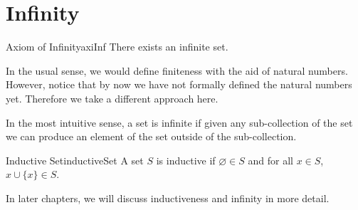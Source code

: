 \documentclass[math]{amznotes}
\theoremstyle{remark}
\begin{document}
\section{Infinity}
\begin{axibox}{Axiom of Infinity}{axiInf}
    There exists an infinite set.
\end{axibox}
In the usual sense, we would define finiteness with the aid of natural numbers. However, notice that by now we have not formally defined the natural numbers yet. Therefore we take a different approach here.

In the most intuitive sense, a set is infinite if given any sub-collection of the set we can produce an element of the set outside of the sub-collection.
\begin{dfnbox}{Inductive Set}{inductiveSet}
    A set $S$ is inductive if $\varnothing \in S$ and for all $x \in S$, $x \cup \{x\} \in S$.
\end{dfnbox}
In later chapters, we will discuss inductiveness and infinity in more detail.
\end{document}
